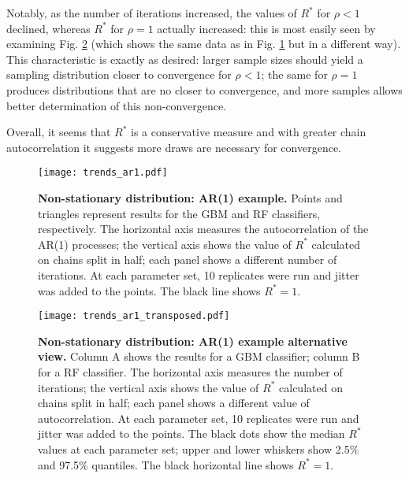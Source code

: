 \documentclass{article}
\begin{document}
Notably, as the number of iterations increased, the values of $R^*$ for $\rho<1$ declined, whereas $R^*$ for $\rho=1$ actually increased: this is most easily seen by examining Fig. \ref{fig:trends_ar1_transposed} (which shows the same data as in Fig. \ref{fig:trends_ar1} but in a different way). This characteristic is exactly as desired: larger sample sizes should yield a sampling distribution closer to convergence for $\rho<1$; the same for $\rho=1$ produces distributions that are no closer to convergence, and more samples allows better determination of this non-convergence.

Overall, it seems that $R^*$ is a conservative measure and with greater chain autocorrelation it suggests more draws are necessary for convergence.

\begin{figure}[!htb]
	\centerline{\texttt{[image: trends\_ar1.pdf]}}
	\caption{\textbf{Non-stationary distribution: AR(1) example.} Points and triangles represent results for the GBM and RF classifiers, respectively. The horizontal axis measures the autocorrelation of the AR(1) processes; the vertical axis shows the value of $R^*$ calculated on chains split in half; each panel shows a different number of iterations. At each parameter set, 10 replicates were run and jitter was added to the points. The black line shows $R^*=1$.}
	\label{fig:trends_ar1}
\end{figure}

\begin{figure}[!htb]
	\centerline{\texttt{[image: trends\_ar1\_transposed.pdf]}}
	\caption{\textbf{Non-stationary distribution: AR(1) example alternative view.} Column A shows the results for a GBM classifier; column B for a RF classifier. The horizontal axis measures the number of iterations; the vertical axis shows the value of $R^*$ calculated on chains split in half; each panel shows a different value of autocorrelation. At each parameter set, 10 replicates were run and jitter was added to the points. The black dots show the median $R^*$ values at each parameter set; upper and lower whiskers show 2.5\% and 97.5\% quantiles. The black horizontal line shows $R^*=1$. }
	\label{fig:trends_ar1_transposed}
\end{figure}
\end{document}
